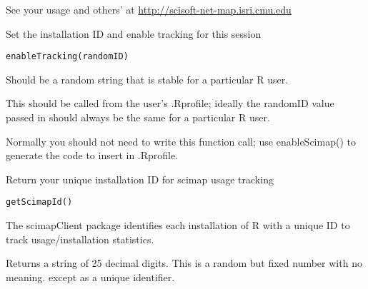 \documentclass[letterpaper]{book}
\begin{document}
%
\begin{References}\relax
See your usage and others' at \url{http://scisoft-net-map.isri.cmu.edu}
\end{References}
%
\begin{SeeAlso}\relax
{}
\end{SeeAlso}
%
\begin{Description}\relax
Set the installation ID and enable tracking for this session
\end{Description}
%
\begin{Usage}
\begin{verbatim}
enableTracking(randomID)
\end{verbatim}
\end{Usage}
%
\begin{Arguments}
\begin{ldescription}
\item[\code{randomID}] Should be a random string that is stable for a particular
R user.
\end{ldescription}
\end{Arguments}
%
\begin{Details}\relax
This should be called from the user's .Rprofile; ideally the
randomID value passed in should always be the same for a particular R
user.

Normally you should not need to write this function call; use enableScimap()
to generate the code to insert in .Rprofile.
\end{Details}
%
\begin{Description}\relax
Return your unique installation ID for scimap usage tracking
\end{Description}
%
\begin{Usage}
\begin{verbatim}
getScimapId()
\end{verbatim}
\end{Usage}
%
\begin{Details}\relax
The scimapClient package identifies each installation of R with
a unique ID to track usage/installation statistics.
\end{Details}
%
\begin{Value}
Returns a string of 25 decimal digits.  This
is a random but fixed number with no meaning.
except as a unique identifier.
\end{Value}
\end{document}
